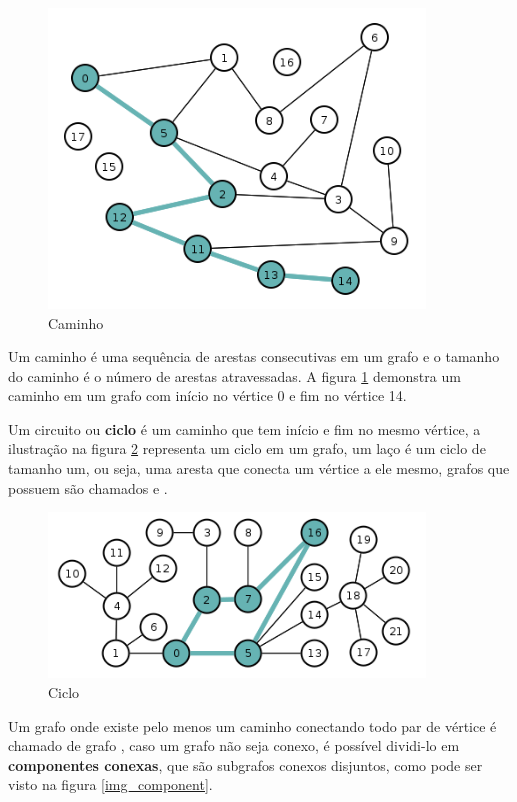 \documentclass[a4paper]{abnt}
\begin{document}
\begin{figure}[htb]
    \centering
	\includegraphics[width=10cm]{path.png}
	\caption{Caminho}
	\label{img_path}
\end{figure}

Um caminho é uma sequência de arestas consecutivas em um grafo e o tamanho do caminho é o número de arestas atravessadas. A figura \ref{img_path} demonstra um caminho em um grafo com início no vértice 0 e fim no vértice 14.

Um circuito ou \textbf{ciclo} é um caminho que tem início e fim no mesmo vértice, a ilustração na figura \ref{img_cilce} representa um ciclo em um grafo, um laço é um ciclo de tamanho um, ou seja, uma aresta que conecta um vértice a ele mesmo, grafos que possuem  são chamados e .

\begin{figure}[htb]
    \centering
	\includegraphics[width=10cm]{cicle.png}
	\caption{Ciclo}
	\label{img_cilce}
\end{figure}

Um grafo onde existe pelo menos um caminho conectando todo par de vértice é chamado de grafo , caso um grafo não seja conexo, é possível dividi-lo em \textbf{componentes conexas}, que são subgrafos conexos disjuntos, como pode ser visto na figura \ref{img_component}.
\end{document}
